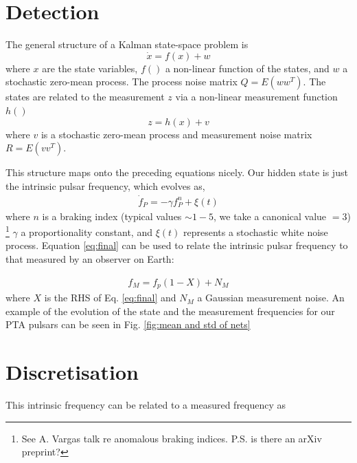 \documentclass[fleqn,usenatbib,useAMS]{mnras}
\begin{document}
\section{Detection}






\noindent The general structure of a Kalman state-space problem is
\begin{equation}
	\dot{x} = f(x) + w
\end{equation}
where $x$ are the state variables, $f()$ a non-linear function of the states, and $w$ a stochastic zero-mean process. The process noise matrix $Q = E(w w^T)$. The states are related to the measurement $z$ via a non-linear measurement function $h()$
\begin{equation}
	z = h(x) + v
\end{equation}
where $v$ is a stochastic zero-mean process and measurement noise matrix $R = E(v v^T)$. \newline 


\noindent This structure maps onto the preceding equations nicely. Our hidden state is just the intrinsic pulsar frequency, which evolves as,
\begin{eqnarray}
	\dot{f}_P = -\gamma f_P^n + \xi(t)
\end{eqnarray}
where $n$ is a braking index (typical values $\sim 1-5$, we take a canonical value $=3$) \footnote{See A. Vargas talk re anomalous braking indices. P.S. is there an arXiv preprint?} $\gamma$ a proportionality constant, and $\xi(t)$ represents a stochastic white noise process. Equation \ref{eq:final} can be used to relate the intrinsic pulsar frequency to that measured by an observer on Earth:

\begin{eqnarray}
	f_M = f_p(1 - X) + N_M
\end{eqnarray}
where $X$ is the RHS of Eq. \ref{eq:final} and $N_M$ a Gaussian measurement noise. An example of the evolution of the state and the measurement frequencies for our PTA pulsars can be seen in Fig. \ref{fig:mean and std of nets}









\section{Discretisation}

This intrinsic frequency can be related to a measured frequency as 
\end{document}
